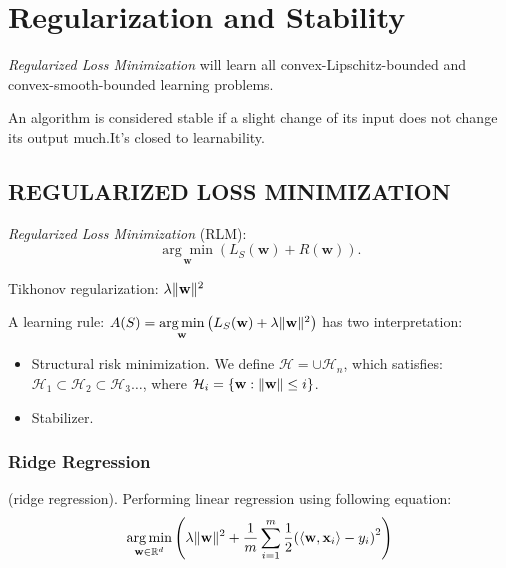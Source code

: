 
\section{Regularization and Stability}

\emph{Regularized Loss Minimization} will learn all convex-Lipschitz-bounded and convex-smooth-bounded learning problems.

An algorithm is considered stable if a slight change of its input does not change its output much.It's closed to 
learnability.

\subsection{REGULARIZED LOSS MINIMIZATION} \emph{Regularized Loss Minimization} (RLM):
\[ \underset{\mathbf{w}}{\arg\min} \left( L_S(\mathbf{w}) + R(\mathbf{w}) \right).\]

Tikhonov regularization: $ \lambda \Arrowvert \mathbf{w} \Arrowvert^2 $

A learning rule: $ A(S) = \underset{\mathbf{w}}{\arg\min} \left( L_S(\mathbf w) + \lambda 
\Arrowvert \mathbf{w} \Arrowvert^2 \right) $ has two interpretation:
\begin{itemize}
	\item Structural risk minimization. We define $ \mathcal{H} = \cup \mathcal{H}_n $,
		which satisfies: $ \mathcal{H}_1 \subset \mathcal{H}_2 \subset \mathcal{H}_3 \dots $,
		where $ \mathcal{H}_i = \{ \mathbf{w}: \Arrowvert \mathbf{w} \Arrowvert \le i \} $.
	\item Stabilizer.
\end{itemize}

\subsubsection{Ridge Regression}

\begin{defn}
	(ridge regression).
	Performing linear regression using following equation:
	\begin{equation}
		\underset{\mathbf{w} \in \mathbb{R}^d}{\arg\min}
		\left( 
			\lambda \Arrowvert \mathbf{w} \Arrowvert^2
			+ \frac{1}{m} \sum\limits^m_{i=1}\frac{1}{2}
			{(\langle \mathbf{w}, \mathbf{x}_i \rangle - y_i)}^2
		\right)
	\end{equation}
\end{defn}

